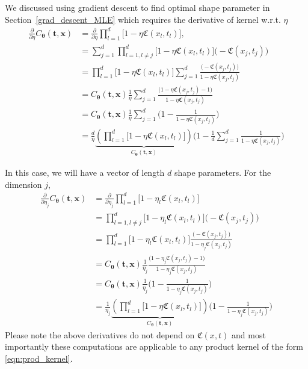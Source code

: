 \documentclass{iitthesis}          %
\newcommand{\bm}[1]{\boldsymbol{#1}}
\newcommand{\vtheta}{{\bm{\theta}}}
\newcommand{\vt}{\bm{t}}
\newcommand{\vx}{\bm{x}}
\newcommand\secref{Section~\ref}
\begin{document}
\label{sec:deriv_of_kernel}
We discussed using gradient descent to find optimal shape parameter in  \secref{grad_descent_MLE} which requires the derivative of kernel w.r.t. $\eta$
\begin{align*}
\frac{\partial}{\partial \eta} C_\vtheta(\vt, \vx) 
& =
\frac{\partial}{\partial \eta} 
\prod_{l=1}^d \biggl[
1 - \eta \mathfrak{C}(x_l,t_l) \biggr], %
\\
& = 
\sum_{j=1}^d  
\prod_{l=1, l \neq j}^d \biggl[
1 - \eta \mathfrak{C}(x_l,t_l) \biggr]
\biggl( - \mathfrak{C}(x_j,t_j) \biggr)
\\
& =
\prod_{l=1}^d \biggl[
1 - \eta \mathfrak{C}(x_l,t_l) \biggr]
\sum_{j=1}^d 
\frac{
	\biggl( - \mathfrak{C}(x_j,t_j) \biggr)
}{
	1 - \eta \mathfrak{C}(x_j,t_j) 
}
\\
& =
C_\vtheta(\vt, \vx) 
\frac{1}{\eta}
\sum_{j=1}^d 
\frac{
	\biggl(1 - \eta \mathfrak{C}({x_j,t_j})  - 1 \biggr)
}{
	1 - \eta \mathfrak{C}(x_j,t_j) 
}
\\
& =
C_\vtheta(\vt, \vx) 
\frac{1}{\eta}
\sum_{j=1}^d 
\biggl(
1 - 
\frac{1
}{
	1 - \eta \mathfrak{C}(x_j,t_j) 
}
\biggr)
\\
& =
\frac{d}{\eta} 
\underbrace{
	\left(
	\prod_{l=1}^d \biggl[
	1 - \eta \mathfrak{C}(x_l,t_l) \biggr]
	\right) }_
{ C_\vtheta(\vt, \vx) }
\biggl(
1 - 
\frac{1}{d} \sum_{j=1}^d
\frac{1}
{ 1 - \eta \mathfrak{C}(x_j,t_j) }
\biggr)
\end{align*}

In this case, we will have a vector of length $d$ shape parameters. For the dimension $j$,
\begin{align*}
\frac{\partial}{\partial \eta_j} C_\vtheta(\vt, \vx) 
& =
\frac{\partial}{\partial \eta_j} 
\prod_{l=1}^d \biggl[
1 - \eta_l \mathfrak{C}(x_l,t_l) \biggr]
\\
& = 
\prod_{l=1, l \neq j}^d \biggl[
1 - \eta_l \mathfrak{C}(x_l,t_l) \biggr]
\biggl( - \mathfrak{C}(x_j,t_j) \biggr)
\\
& =
\prod_{l=1}^d \biggl[
1 - \eta_l \mathfrak{C}(x_l,t_l) \biggr]
\frac{
	\biggl( - \mathfrak{C}(x_j,t_j) \biggr)
}{
	1 - \eta_j \mathfrak{C}(x_j,t_j) 
}
\\
& =
C_\vtheta(\vt, \vx) 
\frac{1}{\eta_j}
\frac{
	\biggl(1 - \eta_j \mathfrak{C}(x_j,t_j)  - 1 \biggr)
}{
	1 - \eta_j \mathfrak{C}(x_j,t_j) 
}
\\
& =
C_\vtheta(\vt, \vx) 
\frac{1}{\eta_j}
\biggl(
1 - 
\frac{1
}{
	1 - \eta_j \mathfrak{C}(x_j,t_j) 
}
\biggr)
\\
& =
\frac{1}{\eta_j} 
\underbrace{
	\left(
	\prod_{l=1}^d \biggl[
	1 - \eta \mathfrak{C}(x_l,t_l) \biggr]
	\right) }_
{ C_\vtheta(\vt, \vx) }
\biggl(
1 - 
\frac{1}
{ 1 - \eta_j \mathfrak{C}(x_j,t_j) }
\biggr)
\end{align*}
Please note the above derivatives do not depend on $\mathfrak{C}(x,t)$ and most importantly these computations are applicable to any product kernel of the form \eqref{eqn:prod_kernel}.
\end{document}
